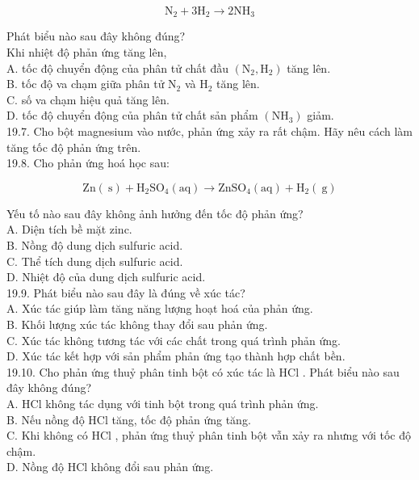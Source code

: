 \documentclass[10pt]{article}
\begin{document}
$$
\mathrm{N}_{2}+3 \mathrm{H}_{2} \rightarrow 2 \mathrm{NH}_{3}
$$

Phát biểu nào sau đây không đúng?\\
Khi nhiệt độ phản ứng tăng lên,\\
A. tốc độ chuyển động của phân tử chất đầu $\left(\mathrm{N}_{2}, \mathrm{H}_{2}\right)$ tăng lên.\\
B. tốc độ va chạm giữa phân tử $\mathrm{N}_{2}$ và $\mathrm{H}_{2}$ tăng lên.\\
C. số va chạm hiệu quả tăng lên.\\
D. tốc độ chuyển động của phân tử chất sản phẩm $\left(\mathrm{NH}_{3}\right)$ giảm.\\
19.7. Cho bột magnesium vào nước, phản ứng xảy ra rất chậm. Hãy nêu cách làm tăng tốc độ phản ứng trên.\\
19.8. Cho phản ứng hoá học sau:

$$
\mathrm{Zn}(\mathrm{~s})+\mathrm{H}_{2} \mathrm{SO}_{4}(\mathrm{aq}) \rightarrow \mathrm{ZnSO}_{4}(\mathrm{aq})+\mathrm{H}_{2}(\mathrm{~g})
$$

Yếu tố nào sau đây không ảnh hưởng đến tốc độ phản ứng?\\
A. Diện tích bề mặt zinc.\\
B. Nồng độ dung dịch sulfuric acid.\\
C. Thể tích dung dịch sulfuric acid.\\
D. Nhiệt độ của dung dịch sulfuric acid.\\
19.9. Phát biểu nào sau đây là đúng về xúc tác?\\
A. Xúc tác giúp làm tăng năng lượng hoạt hoá của phản ứng.\\
B. Khối lượng xúc tác không thay đổi sau phản ứng.\\
C. Xúc tác không tương tác với các chất trong quá trình phản ứng.\\
D. Xúc tác kết hợp với sản phẩm phản ứng tạo thành hợp chất bền.\\
19.10. Cho phản ứng thuỷ phân tinh bột có xúc tác là HCl . Phát biểu nào sau đây không đúng?\\
A. HCl không tác dụng với tinh bột trong quá trình phản ứng.\\
B. Nếu nồng độ HCl tăng, tốc độ phản ứng tăng.\\
C. Khi không có HCl , phản ứng thuỷ phân tinh bột vẫn xảy ra nhưng với tốc độ chậm.\\
D. Nồng độ HCl không đổi sau phản ứng.
\end{document}
